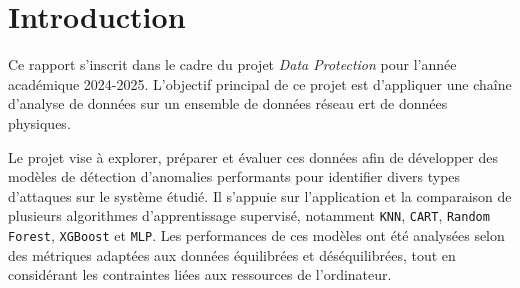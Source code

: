 \section*{Introduction}

Ce rapport s'inscrit dans le cadre du projet \textit{Data Protection} pour l'année académique 2024-2025. L'objectif principal de ce projet est d'appliquer une chaîne d'analyse de données sur un ensemble de données réseau ert de données physiques.

Le projet vise à explorer, préparer et évaluer ces données afin de développer des modèles de détection d'anomalies performants pour identifier divers types d'attaques sur le système étudié. Il s'appuie sur l'application et la comparaison de plusieurs algorithmes d'apprentissage supervisé, notamment \texttt{KNN}, \texttt{CART}, \texttt{Random Forest}, \texttt{XGBoost} et \texttt{MLP}. Les performances de ces modèles ont été analysées selon des métriques adaptées aux données équilibrées et déséquilibrées, tout en considérant les contraintes liées aux ressources de l'ordinateur.